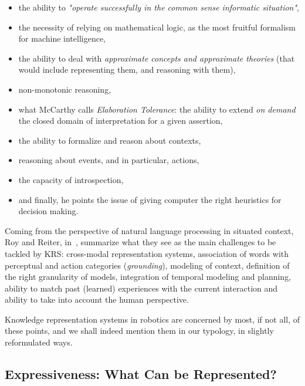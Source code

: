 \begin{itemize}

	\item the ability to \emph{"operate successfully in the common sense
	informatic situation"},

	\item the necessity of relying on mathematical logic, as the most fruitful
	formalism for machine intelligence,

	\item the ability to deal with \emph{approximate concepts and approximate
	theories} (that would include representing them, and reasoning with them),

	\item non-monotonic reasoning,

	\item what McCarthy calls \emph{Elaboration Tolerance}: the ability to
	extend \emph{on demand} the closed domain of interpretation for a
	given assertion,

	\item the ability to formalize and reason about contexts,

	\item reasoning about events, and in particular, actions,

	\item the capacity of introspection,

	\item and finally, he points the issue of giving computer the right
	heuristics for decision making.

\end{itemize}

Coming from the perspective of natural language processing in situated context,
Roy and Reiter, in~\cite{Roy2005}, summarize what they see as the main
challenges to be tackled by KRS: cross-modal representation systems,
association of words with perceptual and action categories (\emph{grounding}),
modeling of context, definition of the right granularity of models, integration
of temporal modeling and planning, ability to match past (learned) experiences
with the current interaction and ability to take into account the human
perspective.

Knowledge representation systems in robotics are concerned by most, if not all,
of these points, and we shall indeed mention them in our typology, in slightly
reformulated ways.



\subsection{Expressiveness: What Can be Represented?}
\label{sect|expressiveness}


